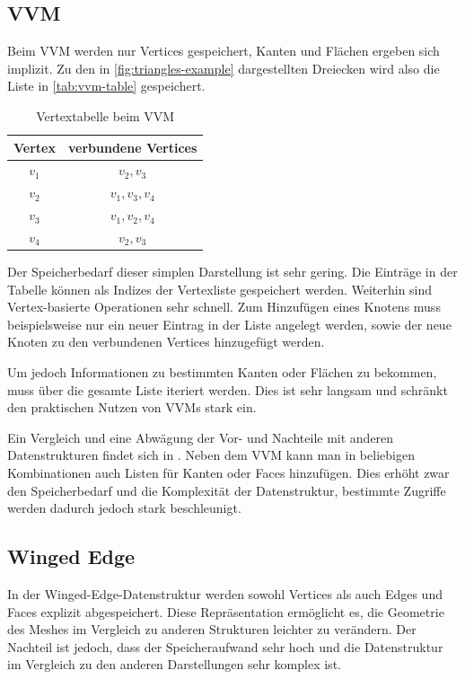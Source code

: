 \subsection{\acl{VVM}}
\label{subsec:v-v-mesh}

Beim \ac{VVM} werden nur Vertices gespeichert, Kanten und Flächen ergeben sich implizit.
Zu den in \autoref{fig:triangles-example} dargestellten Dreiecken wird also die Liste in \autoref{tab:vvm-table} gespeichert.

\begin{table}[ht]
\centering
\begin{tabular}{| c | c |}
	\hline
	Vertex & verbundene Vertices\\
	\hline
	$v_1$ & $v_2, v_3$\\
	$v_2$ & $v_1, v_3, v_4$\\
	$v_3$ & $v_1, v_2, v_4$\\
	$v_4$ & $v_2, v_3$\\
	\hline
\end{tabular}
\caption{Vertextabelle beim \ac{VVM}}
\label{tab:vvm-table}
\end{table}

Der Speicherbedarf dieser simplen Darstellung ist sehr gering.
Die Einträge in der Tabelle können als Indizes der Vertexliste gespeichert werden.
Weiterhin sind Vertex-basierte Operationen sehr schnell.
Zum Hinzufügen eines Knotens muss beispielsweise nur ein neuer Eintrag in der Liste angelegt werden, sowie der neue Knoten zu den verbundenen Vertices hinzugefügt werden.

Um jedoch Informationen zu bestimmten Kanten oder Flächen zu bekommen, muss über die gesamte Liste iteriert werden.
Dies ist sehr langsam und schränkt den praktischen Nutzen von \acp{VVM} stark ein.

Ein Vergleich und eine Abwägung der Vor- und Nachteile mit anderen Datenstrukturen findet sich in \cite[Kap. 11]{smith2006vertex}.
Neben dem \ac{VVM} kann man in beliebigen Kombinationen auch Listen für Kanten oder Faces hinzufügen.
Dies erhöht zwar den Speicherbedarf und die Komplexität der Datenstruktur, bestimmte Zugriffe werden dadurch jedoch stark beschleunigt.


\subsection{Winged Edge}
\label{subsec:winged-edge}

In der Winged-Edge-Datenstruktur \cite{baumgart1975polyhedron} werden sowohl Vertices als auch Edges und Faces explizit abgespeichert.
Diese Repräsentation ermöglicht es, die Geometrie des Meshes im Vergleich zu anderen Strukturen leichter zu verändern.
Der Nachteil ist jedoch, dass der Speicheraufwand sehr hoch und die Datenstruktur im Vergleich zu den anderen Darstellungen sehr komplex ist.

